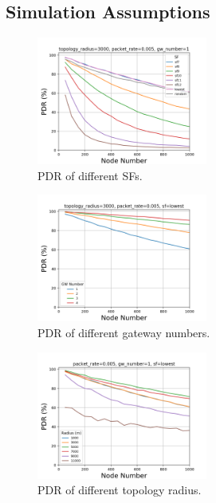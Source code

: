 \documentclass[conference]{IEEEtran}
\begin{document}
\subsection{Simulation Assumptions}
\par [TODO]

\begin{figure}
\centering
\includegraphics[width=0.5\textwidth]{sf_pdr}
\caption{PDR of different SFs.}
\label{fig:sf_pdr}
\end{figure}

\begin{figure}
\centering
\includegraphics[width=0.5\textwidth]{gw_pdr}
\caption{PDR of different gateway numbers.}
\label{fig:gw_pdr}
\end{figure}

\begin{figure}
\centering
\includegraphics[width=0.5\textwidth]{r_pdr}
\caption{PDR of different topology radius.}
\label{fig:r_pdr}
\end{figure}
\end{document}
